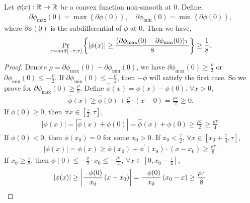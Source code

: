 \begin{lem}
\label{lem:non_smooth_convex}
	Let $\phi(x) : {\mathbb{R}} \to {\mathbb{R}}$ be a convex function non-smooth at $0$. Define,
\begin{equation*}
\begin{split}
	\partial\phi_{\max}{(0)} = \max\left\{ \partial\phi(0) \right\}, \quad \partial\phi_{\min}{(0)} = \min\left\{ \partial\phi(0) \right\},
\end{split}
\end{equation*}	
where $\partial\phi(0)$ is the subdifferential of $\phi$ at $0$. Then we have,
\begin{equation*}
\begin{split}
	\operatorname*{Pr}\limits_{x \sim {\text{unif}}[-\tau, \tau]}\left\{ \left| \phi(x) \right| \ge \frac{ ( \partial\phi_{\max}{(0)} - \partial\phi_{\min}{(0)} ) \tau}{8} \right\} \ge \frac{1}{8}.
\end{split}
\end{equation*}	
\end{lem}
\begin{proof}
	Denote $\rho = \partial\phi_{\max}{(0)} - \partial\phi_{\min}{(0)}$, we have $\partial\phi_{\max}{(0)} \ge \frac{\rho}{2}$ or $\partial\phi_{\min}{(0)} \le - \frac{\rho}{2}$. If $\partial\phi_{\min}{(0)} \le - \frac{\rho}{2}$, then $-\phi$ will satisfy the first case. So we prove for $\partial\phi_{\max}{(0)} \ge \frac{\rho}{2}$. Define $\hat{\phi}(x) = \phi(x) - \phi(0)$. $\forall x > 0$,
\begin{equation*}
\begin{split}
	\hat{\phi}(x) \ge \hat{\phi}(0) + \frac{\rho}{2} \cdot \left( x - 0\right) = \frac{\rho x}{2} \ge 0.
\end{split}
\end{equation*}
If $\phi(0) \ge 0$, then $\forall x \in \left[\frac{\tau}{2}, \tau \right]$,
\begin{equation*}
\begin{split}
	\left| \phi(x) \right| = | \hat{\phi}(x) + \phi(0) | = \hat{\phi}(x) + \phi(0) \ge \frac{\rho x}{2} \ge \frac{\rho \tau}{4}.
\end{split}
\end{equation*}
If $\phi(0) < 0$, then $\phi(x_0) = 0$ for some $x_0 > 0$. If $x_0 < \frac{\tau}{2}$, $\forall x \in \left[x_0 + \frac{\tau}{4}, \tau \right]$,
\begin{equation*}
\begin{split}
	\left| \phi(x) \right| =  \phi(x) \ge \phi(x_0) + \phi^\prime(x_0) \cdot \left( x - x_0 \right) \ge \frac{\rho \tau}{8}.
\end{split}
\end{equation*}
If $x_0 \ge \frac{\tau}{2}$, then $\phi(0) \le - \frac{\rho}{2} \cdot x_0 \le - \frac{\rho\tau}{4}$, $\forall x \in \left[0, x_0 - \frac{\tau}{4} \right]$,
\begin{equation*}
	\left| \phi(x) \right| \ge \left| \frac{-\phi(0)}{x_0} \left( x - x_0 \right) \right| = \frac{-\phi(0)}{x_0} \left( x_0 - x \right) \ge \frac{\rho\tau}{8}. \qedhere
\end{equation*}
\end{proof}

